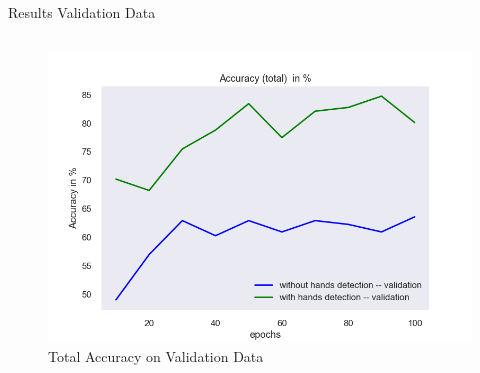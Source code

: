 \documentclass[aspectratio=169]{beamer}
\begin{document}
{\begin{frame}{Results Validation Data}
\begin{columns}
    \begin{figure}
        \centering
        \includegraphics[width=1\textwidth]{img/experiment/model_comp_10steps__val_acc_total.png}
        \caption{Total Accuracy on Validation Data}
    \end{figure}      


\end{columns}
\end{frame}}
\end{document}
